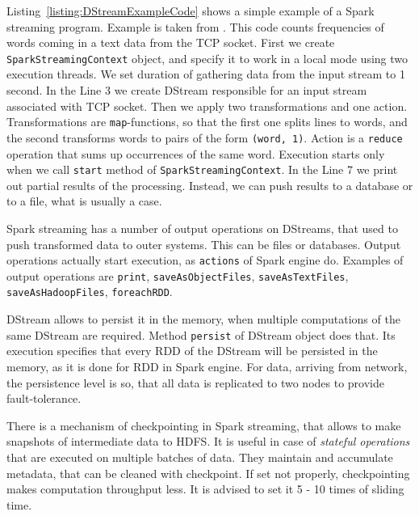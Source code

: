 Listing~\ref{listing:DStreamExampleCode} shows a simple example of a Spark streaming program.
Example is taken from \cite{Spark2}.
This code counts frequencies of words coming in a text data from the TCP socket.
First we create \lstinline{SparkStreamingContext} object, and specify it to work in a local mode using two execution threads.
We set duration of gathering data from the input stream to 1 second.
In the Line 3 we create DStream responsible for an input stream associated with TCP socket.
Then we apply two transformations and one action.
Transformations are \lstinline{map}-functions, so that the first one splits lines to words, and the second transforms words to pairs of the form \lstinline{(word, 1)}.
Action is a \lstinline{reduce} operation that sums up occurrences of the same word.
Execution starts only when we call \lstinline{start} method of \lstinline{SparkStreamingContext}.
In the Line 7 we print out partial results of the processing.
Instead, we can push results to a database or to a file, what is usually a case.

Spark streaming has a number of output operations on DStreams, that used to push transformed data to outer systems.
This can be files or databases.
Output operations actually start execution, as \lstinline{actions} of Spark engine do.
Examples of output operations are \lstinline{print}, \lstinline{saveAsObjectFiles}, \lstinline{saveAsTextFiles}, \lstinline{saveAsHadoopFiles}, \lstinline{foreachRDD}.

DStream allows to persist it in the memory, when multiple computations of the same DStream are required.
Method \lstinline{persist} of DStream object does that.
Its execution specifies that every RDD of the DStream will be persisted in the memory, as it is done for RDD in Spark engine.
For data, arriving from network, the persistence level is so, that all data is replicated to two nodes to provide fault-tolerance.

There is a mechanism of checkpointing in Spark streaming, that allows to make snapshots of intermediate data to HDFS.
It is useful in case of \textit{stateful operations} that are executed on multiple batches of data.
They maintain and accumulate metadata, that can be cleaned with checkpoint.
If set not properly, checkpointing makes computation throughput less.
It is advised to set it 5 - 10 times of sliding time.